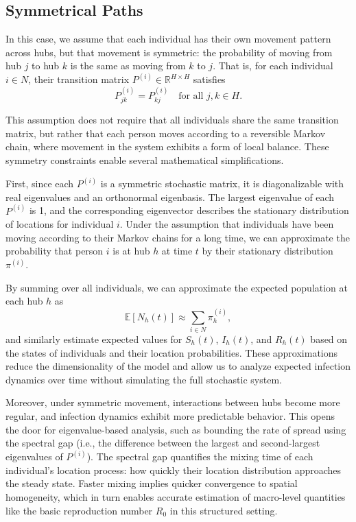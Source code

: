 \documentclass[12pt]{article}
\begin{document}
\subsection{Symmetrical Paths}
In this case, we assume that each individual has their own movement pattern across hubs, but that movement is symmetric: the probability of moving from hub $j$ to hub $k$ is the same as moving from $k$ to $j$. That is, for each individual $i \in N$, their transition matrix $P^{(i)} \in \mathbb{R}^{H \times H}$ satisfies
\[
P^{(i)}_{jk} = P^{(i)}_{kj} \quad \text{for all } j, k \in H.
\]

This assumption does not require that all individuals share the same transition matrix, but rather that each person moves according to a reversible Markov chain, where movement in the system exhibits a form of local balance. These symmetry constraints enable several mathematical simplifications.

First, since each $P^{(i)}$ is a symmetric stochastic matrix, it is diagonalizable with real eigenvalues and an orthonormal eigenbasis. The largest eigenvalue of each $P^{(i)}$ is 1, and the corresponding eigenvector describes the stationary distribution of locations for individual $i$. Under the assumption that individuals have been moving according to their Markov chains for a long time, we can approximate the probability that person $i$ is at hub $h$ at time $t$ by their stationary distribution \( \pi^{(i)} \).

By summing over all individuals, we can approximate the expected population at each hub $h$ as
\[
\mathbb{E}[N_h(t)] \approx \sum_{i \in N} \pi^{(i)}_h,
\]
and similarly estimate expected values for \( S_h(t) \), \( I_h(t) \), and \( R_h(t) \) based on the states of individuals and their location probabilities. These approximations reduce the dimensionality of the model and allow us to analyze expected infection dynamics over time without simulating the full stochastic system.

Moreover, under symmetric movement, interactions between hubs become more regular, and infection dynamics exhibit more predictable behavior. This opens the door for eigenvalue-based analysis, such as bounding the rate of spread using the spectral gap (i.e., the difference between the largest and second-largest eigenvalues of \( P^{(i)} \)). The spectral gap quantifies the mixing time of each individual’s location process: how quickly their location distribution approaches the steady state. Faster mixing implies quicker convergence to spatial homogeneity, which in turn enables accurate estimation of macro-level quantities like the basic reproduction number \( R_0 \) in this structured setting.
\end{document}
